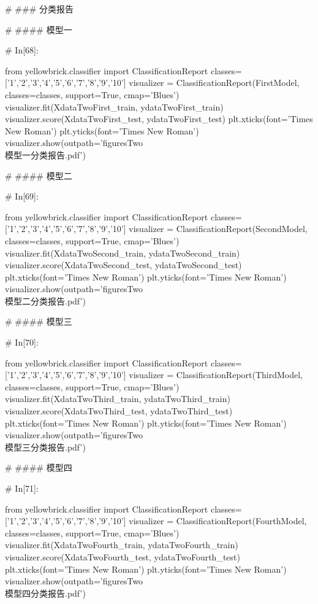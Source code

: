\documentclass{MathorCupmodeling}
\begin{document}
\begin{python}
# ### 分类报告

# #### 模型一

# In[68]:


from yellowbrick.classifier import ClassificationReport
classes=['1','2','3','4','5','6','7','8','9','10']
visualizer = ClassificationReport(FirstModel, classes=classes, support=True, cmap='Blues')
visualizer.fit(XdataTwoFirst_train, ydataTwoFirst_train)
visualizer.score(XdataTwoFirst_test, ydataTwoFirst_test)
plt.xticks(font='Times New Roman')
plt.yticks(font='Times New Roman')
visualizer.show(outpath='figuresTwo\\[附件2]模型一分类报告.pdf')


# #### 模型二

# In[69]:


from yellowbrick.classifier import ClassificationReport
classes=['1','2','3','4','5','6','7','8','9','10']
visualizer = ClassificationReport(SecondModel, classes=classes, support=True, cmap='Blues')
visualizer.fit(XdataTwoSecond_train, ydataTwoSecond_train)
visualizer.score(XdataTwoSecond_test, ydataTwoSecond_test)
plt.xticks(font='Times New Roman')
plt.yticks(font='Times New Roman')
visualizer.show(outpath='figuresTwo\\[附件2]模型二分类报告.pdf')


# #### 模型三

# In[70]:


from yellowbrick.classifier import ClassificationReport
classes=['1','2','3','4','5','6','7','8','9','10']
visualizer = ClassificationReport(ThirdModel, classes=classes, support=True, cmap='Blues')
visualizer.fit(XdataTwoThird_train, ydataTwoThird_train)
visualizer.score(XdataTwoThird_test, ydataTwoThird_test)
plt.xticks(font='Times New Roman')
plt.yticks(font='Times New Roman')
visualizer.show(outpath='figuresTwo\\[附件2]模型三分类报告.pdf')


# #### 模型四

# In[71]:


from yellowbrick.classifier import ClassificationReport
classes=['1','2','3','4','5','6','7','8','9','10']
visualizer = ClassificationReport(FourthModel, classes=classes, support=True, cmap='Blues')
visualizer.fit(XdataTwoFourth_train, ydataTwoFourth_train)
visualizer.score(XdataTwoFourth_test, ydataTwoFourth_test)
plt.xticks(font='Times New Roman')
plt.yticks(font='Times New Roman')
visualizer.show(outpath='figuresTwo\\[附件2]模型四分类报告.pdf')



\end{python}
\end{document}
